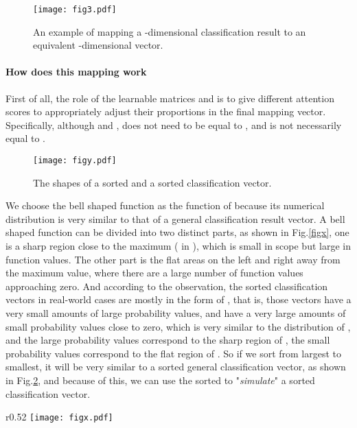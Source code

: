 \documentclass{article}
\begin{document}
\begin{figure}
  \vspace{-0em}  
  \centering
  \texttt{[image: fig3.pdf]}
  \caption{An example of mapping a -dimensional classification result to an equivalent -dimensional vector.}
  \label{fig3}
  \vspace{-1em}  \end{figure}

\paragraph{How does this mapping work}
First of all, the role of the learnable matrices  and  is to give different  attention scores to appropriately adjust their proportions in the final mapping vector. Specifically, although  and ,  does not need to be equal to , and  is not necessarily equal to .

\begin{figure}
  \vspace{0em}  
  \centering
  \texttt{[image: figy.pdf]}
  \caption{The shapes of a sorted  and a sorted classification vector.}
  \label{figy}
  \vspace{-1em}  \end{figure}


We choose the bell shaped function as the function of  because its numerical distribution is very similar to that of a general classification result vector. A bell shaped function can be divided into two distinct parts, as shown in Fig.\ref{figx}, one is a sharp region close to the maximum ( in ), which is small in scope but large in function values. The other part is the flat areas on the left and right away from the maximum value, where there are a large number of function values approaching zero. And according to the observation, the sorted classification vectors in real-world cases are mostly in the form of , that is, those vectors have a very small amounts of large probability values, and have a very large amounts of small probability values close to zero, which is very similar to the distribution of , and the large probability values correspond to the sharp region of , the small probability values correspond to the flat region of . So if we sort  from largest to smallest, it will be very similar to a sorted general classification vector, as shown in Fig.\ref{figy}, and because of this, we can use the sorted  to "\emph{simulate}" a sorted classification vector.


\begin{wrapfigure}{r}{0.52\textwidth}
  \vspace{-1em}  
  \centering
  \texttt{[image: figx.pdf]}
  \caption{Schematic diagram of bell shaped function.}
  \label{figx}
  \vspace{-1em}  \end{wrapfigure}
\end{document}
